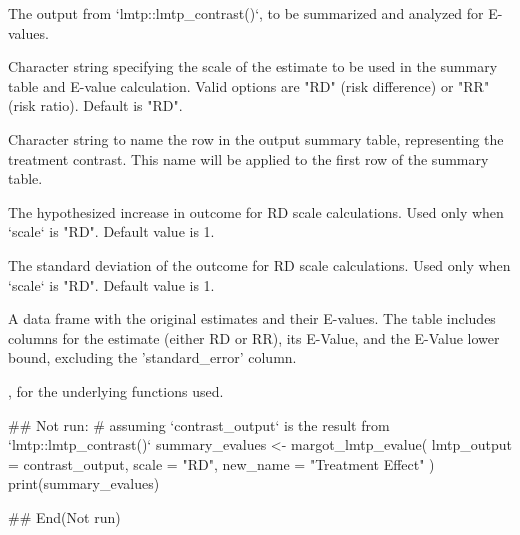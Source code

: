 \documentclass[a4paper]{book}
\begin{document}
%
\begin{Arguments}
\begin{ldescription}
\item[\code{lmtp\_output}] The output from `lmtp::lmtp\_contrast()`, to be summarized and analyzed for E-values.

\item[\code{scale}] Character string specifying the scale of the estimate to be used in the summary table and
E-value calculation. Valid options are "RD" (risk difference) or "RR" (risk ratio). Default is "RD".

\item[\code{new\_name}] Character string to name the row in the output summary table, representing the treatment
contrast. This name will be applied to the first row of the summary table.

\item[\code{delta}] The hypothesized increase in outcome for RD scale calculations. Used only when `scale` is "RD".
Default value is 1.

\item[\code{sd}] The standard deviation of the outcome for RD scale calculations. Used only when `scale` is "RD".
Default value is 1.
\end{ldescription}
\end{Arguments}
%
\begin{Value}
A data frame with the original estimates and their E-values. The table includes columns for the
estimate (either RD or RR), its E-Value, and the E-Value lower bound, excluding the 'standard\_error' column.
\end{Value}
%
\begin{SeeAlso}
,  for the underlying functions used.
\end{SeeAlso}
%
\begin{Examples}
\begin{ExampleCode}
## Not run: 
# assuming `contrast_output` is the result from `lmtp::lmtp_contrast()`
summary_evalues <- margot_lmtp_evalue(
  lmtp_output = contrast_output,
  scale = "RD",
  new_name = "Treatment Effect"
)
print(summary_evalues)

## End(Not run)

\end{ExampleCode}
\end{Examples}
\end{document}
